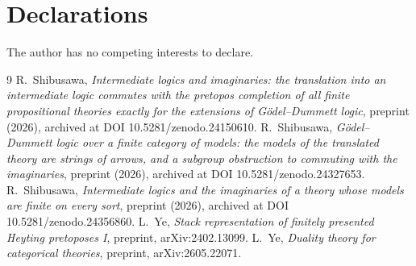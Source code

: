 \documentclass[11pt]{amsart}
\theoremstyle{definition}
\begin{document}
\section*{Declarations}
The author has no competing interests to declare.

\begin{thebibliography}{9}
 R.~Shibusawa, \emph{Intermediate logics and
imaginaries: the translation into an intermediate logic commutes with
the pretopos completion of all finite propositional theories exactly
for the extensions of G\"odel--Dummett logic}, preprint (2026),
archived at DOI 10.5281/zenodo.24150610.
 R.~Shibusawa, \emph{G\"odel--Dummett logic over a
finite category of models: the models of the translated theory are
strings of arrows, and a subgroup obstruction to commuting with the
imaginaries}, preprint (2026), archived at DOI
10.5281/zenodo.24327653.
 R.~Shibusawa, \emph{Intermediate logics and the
imaginaries of a theory whose models are finite on every sort},
preprint (2026), archived at DOI 10.5281/zenodo.24356860.
 L.~Ye, \emph{Stack representation of finitely presented
Heyting pretoposes I}, preprint, arXiv:2402.13099.
 L.~Ye, \emph{Duality theory for categorical theories},
preprint, arXiv:2605.22071.
\end{thebibliography}
\end{document}
